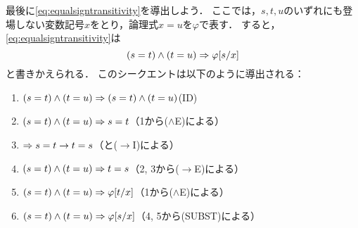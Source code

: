 最後に\cref{eq:equalsigntransitivity}を導出しよう．
ここでは，\(s, t, u\)のいずれにも登場しない変数記号\(x\)をとり，論理式\(x = u\)を\(\varphi\)で表す．
すると，\cref{eq:equalsigntransitivity}は
\begin{equation*}
	\paren{s = t} \land \paren{t = u} \sequent \subst{\varphi}{s/x}
\end{equation*}
と書きかえられる．
このシークエントは以下のように導出される：
\begin{enumerate}
	\item \(\paren{s = t} \land \paren{t = u} \sequent \paren{s = t} \land \paren{t = u}\)\quad (ID)
	\item \(\paren{s = t} \land \paren{t = u} \sequent s = t\)\quad （1から(\(\land\)E)による）
	\item \(\Rightarrow s = t \to t = s\)\quad （と(\(\to\)I)による）
	\item \(\paren{s = t} \land \paren{t = u} \sequent t = s\)\quad （2, 3から(\(\to\)E)による）
	\item \(\paren{s = t} \land \paren{t = u} \sequent \subst{\varphi}{t/x}\)\quad （1から(\(\land\)E)による）
	\item \(\paren{s = t} \land \paren{t = u} \sequent \subst{\varphi}{s/x}\)\quad （4, 5から(SUBST)による）
\end{enumerate}
